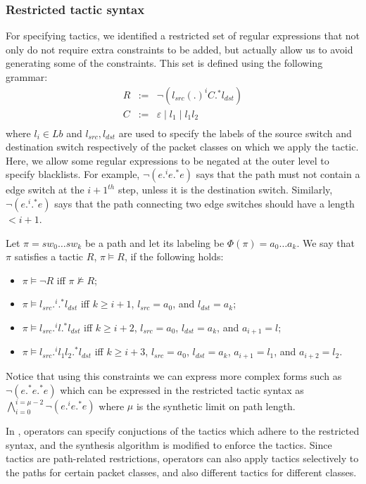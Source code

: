 \subsubsection{Restricted tactic syntax} 
For specifying tactics, we identified a restricted set of regular expressions
 that not only do not require extra constraints to be added,
but actually allow us to avoid generating some of the constraints. 
This set is defined using the following grammar:
$$\begin{array}{rcl}
R  &  :=  &  \neg (l_{src} (.)^i C .^* l_{dst}) \\
C  &  :=  &  \varepsilon \mid l_1 \mid l_1 l_2\\
\end{array}$$
where $l_i\in Lb$ and $l_{src}, l_{dst}$ are used to specify the labels of the source switch 
and destination switch respectively of the packet classes on which we apply the tactic. 
Here, we allow some regular expressions to be negated at the outer level to specify blacklists. For example, $\neg (e .^i e .^* e)$ says that the path must not contain a edge switch at the $i+1^{th}$ step, unless it is the destination switch. 
Similarly, $\neg (e .^i .^* e)$ says that the path connecting two edge switches should have a length $ < i + 1$. 

Let $\pi = sw_0\ldots sw_k$ be a path and 
let its labeling be $\Phi(\pi)= a_0\ldots a_k$.
We say that $\pi$ satisfies a tactic $R$, $\pi\vDash R$, if the following
holds:
\begin{itemize}
\item $\pi \vDash \neg R$ iff $\pi \not\vDash R$;
\item $\pi \vDash  l_{src} .^i .^* l_{dst}$ iff $k\geq i+1$, $l_{src}= a_0$, and $l_{dst}= a_k$; 
\item $\pi \vDash  l_{src} .^i l.^* l_{dst}$ iff $k\geq i+2$, $l_{src}= a_0$, $l_{dst}= a_k$, and $a_{i+1}=l$;
\item $\pi \vDash  l_{src} .^i l_1 l_2.^* l_{dst}$ iff $k\geq i+3$, $l_{src}= a_0$, $l_{dst}= a_k$, $a_{i+1}=l_1$, and $a_{i+2}=l_2$.
\end{itemize}

Notice that using this constraints we can express more complex forms such as
$\neg (e .^* e .^* e)$ which can be expressed in the restricted tactic syntax 
as $\bigwedge \limits_{i=0}^{i=\mu-2} \neg (e .^i e .^* e)$ where $\mu$ is the synthetic limit on path length. 

In \Name, operators can specify conjuctions of the tactics which adhere to the restricted syntax, and the synthesis algorithm is modified to enforce the tactics. Since tactics are path-related restrictions, operators can also apply tactics selectively to the paths for certain packet classes, and also different tactics for different classes. 

